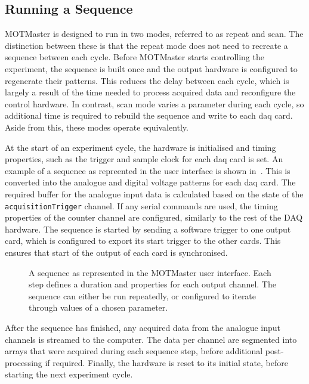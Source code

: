 \subsection{Running a Sequence}
MOTMaster is designed to run in two modes, referred to as repeat and scan.
The distinction between these is that the repeat mode does not need to
recreate a sequence between each cycle. Before MOTMaster starts controlling
the experiment, the sequence is built once and the output hardware is configured
to regenerate their patterns. This reduces the delay between
each cycle, which is largely a result of the time needed to process acquired
data and reconfigure the control hardware. In contrast, scan mode varies a
parameter during each cycle, so additional time is required to rebuild the
sequence and write to each \ac{daq} card. Aside from this, these modes
operate equivalently. \par\noindent
At the start of an experiment cycle, the hardware is
initialised and timing properties, such as the trigger and sample clock for
each \ac{daq} card is set. An example of a sequence as repreented in the user interface is shown in~. This is
converted into the analogue and digital voltage patterns for each \ac{daq}
card. The required buffer for the analogue input
data is calculated based on the state of the \verb|acquisitionTrigger|
channel. If any serial commands are used, the timing properties of the
counter channel are configured, similarly to the rest of the \ac{DAQ}
hardware. The sequence is started by sending a software trigger to one output
card, which is configured to export its start trigger to the other cards.
This ensures that start of the output of each card is synchronised. 
\begin{figure}[!htbp]
    \centering
    \caption[MOTMaster user interface]{A sequence as represented in the MOTMaster user interface. Each step defines a duration and properties for each output channel. The sequence can either be run repeatedly, or configured to iterate through values of a chosen parameter.}
    \label{fig:motmaster_sequence}
\end{figure}
\par\noindent
After the sequence has finished, any acquired data from the analogue input channels is
streamed to the computer. The data per channel are segmented into arrays that
were acquired during each sequence step, before additional post-processing if
required. Finally, the hardware is reset to its initial state, before
starting the next experiment cycle.

